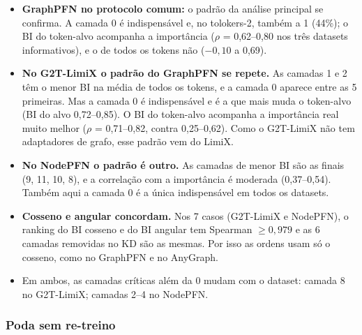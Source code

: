 \documentclass[12pt,a4paper]{article}
\begin{document}
\begin{itemize}
  \item \textbf{GraphPFN no protocolo comum:} o padrão da análise principal se confirma. A camada 0 é indispensável e, no tolokers-2, também a 1 (44\%); o BI do token-alvo acompanha a importância ($\rho$ = 0,62--0,80 nos três datasets informativos), e o de todos os tokens não ($-0{,}10$ a 0,69).
  \item \textbf{No G2T-LimiX o padrão do GraphPFN se repete.} As camadas 1 e 2 têm o menor BI na média de todos os tokens, e a camada 0 aparece entre as 5 primeiras. Mas a camada 0 é indispensável e é a que mais muda o token-alvo (BI do alvo 0,72--0,85). O BI do token-alvo acompanha a importância real muito melhor ($\rho$ = 0,71--0,82, contra 0,25--0,62). Como o G2T-LimiX não tem adaptadores de grafo, esse padrão vem do LimiX.
  \item \textbf{No NodePFN o padrão é outro.} As camadas de menor BI são as finais (9, 11, 10, 8), e a correlação com a importância é moderada (0,37--0,54). Também aqui a camada 0 é a única indispensável em todos os datasets.
  \item \textbf{Cosseno e angular concordam.} Nos 7 casos (G2T-LimiX e NodePFN), o ranking do BI cosseno e do BI angular tem Spearman $\geq 0{,}979$ e as 6 camadas removidas no KD são as mesmas. Por isso as ordens usam só o cosseno, como no GraphPFN e no AnyGraph.
  \item Em ambos, as camadas críticas além da 0 mudam com o dataset: camada 8 no G2T-LimiX; camadas 2--4 no NodePFN.
\end{itemize}

\subsubsection{Poda sem re-treino}
\end{document}
